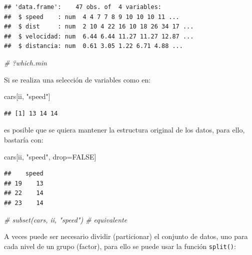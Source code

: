 \documentclass[
]{book}
\newenvironment{Shaded}{\begin{snugshade}}{\end{snugshade}}
\newcommand{\AttributeTok}[1]{\textcolor[rgb]{0.13,0.29,0.53}{#1}}
\newcommand{\CommentTok}[1]{\textcolor[rgb]{0.56,0.35,0.01}{\textit{#1}}}
\newcommand{\ConstantTok}[1]{\textcolor[rgb]{0.56,0.35,0.01}{#1}}
\newcommand{\DecValTok}[1]{\textcolor[rgb]{0.00,0.00,0.81}{#1}}
\newcommand{\FunctionTok}[1]{\textcolor[rgb]{0.13,0.29,0.53}{\textbf{#1}}}
\newcommand{\NormalTok}[1]{#1}
\newcommand{\OtherTok}[1]{\textcolor[rgb]{0.56,0.35,0.01}{#1}}
\newcommand{\SpecialCharTok}[1]{\textcolor[rgb]{0.81,0.36,0.00}{\textbf{#1}}}
\newcommand{\StringTok}[1]{\textcolor[rgb]{0.31,0.60,0.02}{#1}}
\begin{document}
\begin{verbatim}
## 'data.frame':    47 obs. of  4 variables:
##  $ speed    : num  4 4 7 7 8 9 10 10 10 11 ...
##  $ dist     : num  2 10 4 22 16 10 18 26 34 17 ...
##  $ velocidad: num  6.44 6.44 11.27 11.27 12.87 ...
##  $ distancia: num  0.61 3.05 1.22 6.71 4.88 ...
\end{verbatim}

\begin{Shaded}
\begin{Highlighting}[]
\CommentTok{\# ?which.min}
\end{Highlighting}
\end{Shaded}

Si se realiza una selección de variables como en:

\begin{Shaded}
\begin{Highlighting}[]
\NormalTok{cars[ii, }\StringTok{"speed"}\NormalTok{]}
\end{Highlighting}
\end{Shaded}

\begin{verbatim}
## [1] 13 14 14
\end{verbatim}

es posible que se quiera mantener la estructura original de los datos, para ello,
bastaría con:

\begin{Shaded}
\begin{Highlighting}[]
\NormalTok{cars[ii, }\StringTok{"speed"}\NormalTok{, drop}\OtherTok{=}\ConstantTok{FALSE}\NormalTok{]}
\end{Highlighting}
\end{Shaded}

\begin{verbatim}
##    speed
## 19    13
## 22    14
## 23    14
\end{verbatim}

\begin{Shaded}
\begin{Highlighting}[]
\CommentTok{\# subset(cars, ii, "speed") \# equivalente}
\end{Highlighting}
\end{Shaded}

A veces puede ser necesario dividir (particionar) el conjunto de datos, uno para cada nivel de un grupo (factor), para ello se puede usar la función \texttt{split()}:

\begin{Shaded}
\end{Shaded}
\end{document}
